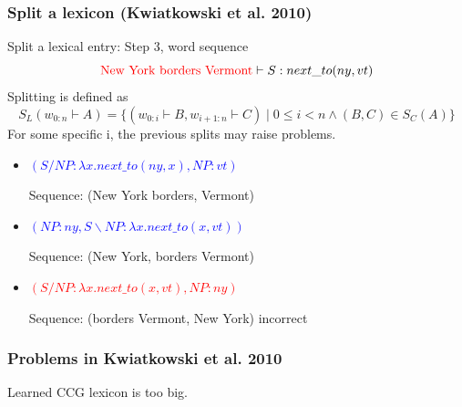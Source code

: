 \documentclass{beamer}
\begin{document}
\begin{frame}
    \frametitle{Split a lexicon (Kwiatkowski et al. 2010)}

    Split a lexical entry: Step 3, word sequence
    \[
        \textcolor{red}{\text{New York borders Vermont}} \vdash S: next\_to(ny, vt)
    \]
    Splitting is defined as
    \[
        S_L(w_{0:n}\vdash A) = \{(w_{0:i}\vdash B, w_{i+1:n}\vdash C) \mid
            0 \leq i < n \wedge (B, C) \in S_C(A) \}
    \] \pause
    For some specific i, the previous splits may raise problems.
    \begin{itemize}
        \item \textcolor{blue}{$(S/NP:\lambda x . next\_to(ny, x), NP:vt)$}

            Sequence: (New York borders, Vermont)

        \item \textcolor{blue}{$(NP:ny, S\backslash NP:\lambda x . next\_to(x, vt))$}

            Sequence: (New York, borders Vermont)

        \item \textcolor{red}{$(S/NP:\lambda x . next\_to(x, vt), NP:ny)$}

            Sequence: (borders Vermont, New York) incorrect

    \end{itemize}

\end{frame}

\begin{frame}
    \frametitle{Problems in Kwiatkowski et al. 2010}

    Learned CCG lexicon is too big.
\end{frame}
\end{document}
